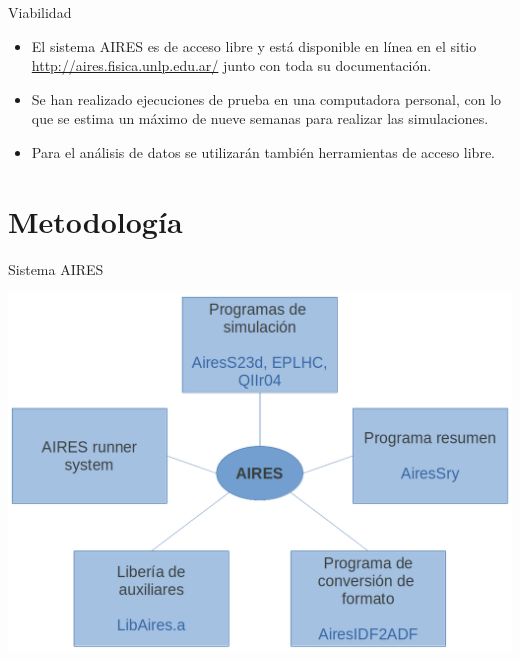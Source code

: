 \documentclass[10pt,xcolor=table]{beamer}
\begin{document}
\begin{frame}{Viabilidad}
\vspace{\fill}
	\begin{itemize}
	\item El sistema AIRES es de acceso libre y está disponible en línea en el sitio \url{http://aires.fisica.unlp.edu.ar/} junto con toda su documentaci\'on. \vspace{0.5 cm}
	\item Se han realizado ejecuciones de prueba en una computadora personal, con lo que se estima un m\'aximo de nueve semanas para realizar las simulaciones. \vspace{0.5 cm}
	\item Para el an\'alisis de datos se utilizar\'an tambi\'en herramientas de acceso libre.
	\end{itemize}
\vspace{\fill}
\end{frame}

\section{Metodología}

\begin{frame}{Sistema AIRES}
\vspace{\fill}
	\begin{center}
	\includegraphics[height=0.8\textheight]{Figuras/airesprograms}
	\end{center}
\vspace{\fill}
\end{frame}
\end{document}
